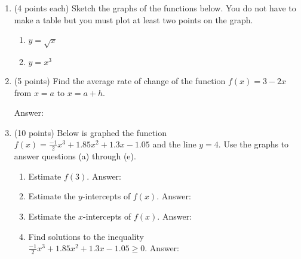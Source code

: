 \documentclass[12pt]{article}
\begin{document}
\begin{enumerate}
\item (4 points each) Sketch the graphs of the functions below. You do not have to make a table but you must plot at least two points on the graph.
\begin{enumerate}
\item $y=\sqrt{x}$
\begin{center}
\end{center}
\vfill
\item $y=x^3$
\begin{center}
\end{center}
\end{enumerate}
\newpage
\item (5 points) Find the average rate of change of the function $f(x)=3-2x$ from $x=a$ to $x=a+h.$
\begin{flushright}{ Answer:\underline{\hspace{2in}}}\end{flushright}
\vfill
\item (10 points) Below is graphed the function $f(x)=\frac{-1}{2}x^3+1.85x^2+1.3x-1.05 $ and the line $y=4.$ Use the graphs to answer questions (a) through (e).

\begin{enumerate}
\item Estimate $f(3).$ \hfill { Answer:\underline{\hspace{2in}}}
\vspace{.2in}
\item Estimate the $y$-intercepts of $f(x)$.\hfill{ Answer:\underline{\hspace{2in}}}
\vspace{.2in}
\item Estimate the $x$-intercepts of $f(x)$.\hfill{ Answer:\underline{\hspace{2in}}}
\item Find solutions to the inequality \\
$\frac{-1}{2}x^3+1.85x^2+1.3x-1.05\geq 0.$
\hfill Answer:\underline{\hspace{2in}}


\end{enumerate}
\end{enumerate}
\end{document}
